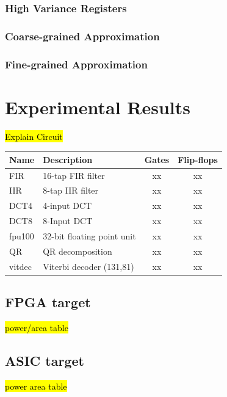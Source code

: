 \documentclass[conference]{IEEEtran}
\begin{document}
\subsubsection{High Variance Registers}
\subsubsection{Coarse-grained Approximation}
\subsubsection{Fine-grained Approximation}


















\section{Experimental Results}
\label{sec:experimental_results}

\hl{Explain Circuit}\\
\begin{tabular} {| l | l | c | c |}
\hline
Name & Description & Gates & Flip-flops \\
\hline\hline
FIR & 16-tap FIR filter & xx & xx \\
IIR & 8-tap IIR filter & xx &xx \\
DCT4 & 4-input DCT & xx & xx \\
DCT8 & 8-Input DCT & xx & xx \\
fpu100 & 32-bit floating point unit & xx & xx \\
QR & QR decomposition & xx & xx \\
vitdec & Viterbi decoder (131,81) & xx & xx \\
\hline
\end{tabular}
\subsection{FPGA target}
\hl{power/area table}
\subsection{ASIC target}
\hl{power area table}
\end{document}
